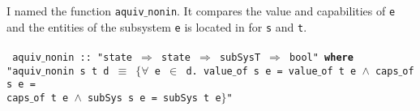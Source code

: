 \begin{enumerate}
I named the function \texttt{aquiv$\_$nonin}. It compares the value and capabilities of \texttt{e} and the entities of the subsystem \texttt{e} is located in for \texttt{s} and \texttt{t}. \\ \\
{
\texttt{
aquiv$\_$nonin :: "state $\Rightarrow$ state $\Rightarrow$ subSysT $\Rightarrow$ bool" \textbf{where} \\
"aquiv$\_$nonin s t d $\equiv$ $\{\forall$ e $\in$ d. value$\_$of s e = value$\_$of t e $\wedge$ caps$\_$of s e = \\
 caps$\_$of t e $\wedge$ subSys s e = subSys t e$\}$"}} 
\end{enumerate}